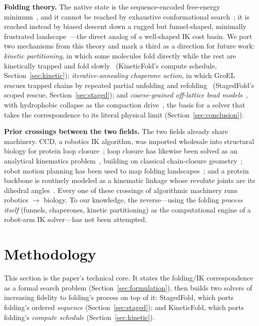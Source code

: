 \documentclass[10pt,conference]{IEEEtran}
\begin{document}
\textbf{Folding theory.} The native state is the sequence-encoded free-energy
minimum~\cite{b23}, and it cannot be reached by exhaustive conformational
search~\cite{b24}; it is reached instead by biased descent down a rugged but
funnel-shaped, minimally frustrated landscape~\cite{b25,b26,b27,b28}---the
direct analog of a well-shaped IK cost basin. We port two mechanisms from this
theory and mark a third as a direction for future work: \emph{kinetic
partitioning}, in which some molecules fold directly while the rest are
kinetically trapped and fold slowly~\cite{b29} (KineticFold's compute schedule,
Section~\ref{sec:kinetic}); \emph{iterative-annealing chaperone action}, in
which GroEL rescues trapped chains by repeated partial unfolding and
refolding~\cite{b30,b31} (StagedFold's scoped rescue,
Section~\ref{sec:staged}); and \emph{coarse-grained off-lattice bead
models}~\cite{b32}, with hydrophobic collapse as the compaction drive~\cite{b33},
the basis for a solver that takes the correspondence to its literal physical
limit (Section~\ref{sec:conclusion}).

\textbf{Prior crossings between the two fields.} The two fields already share
machinery. CCD, a robotics IK algorithm, was imported wholesale into structural
biology for protein loop closure~\cite{b1}; loop closure has likewise been
solved as an analytical kinematics problem~\cite{b34}, building on classical
chain-closure geometry~\cite{b35}; robot motion planning has been used to map
folding landscapes~\cite{b36}; and a protein backbone is routinely modeled as a
kinematic linkage whose revolute joints are its dihedral
angles~\cite{b37,b38}. Every one of these crossings of algorithmic machinery
runs robotics $\rightarrow$ biology. To our knowledge, the reverse---using the
folding \emph{process itself} (funnels, chaperones, kinetic partitioning) as the
computational engine of a robot-arm IK solver---has not been attempted.

\section{Methodology}
\label{sec:method}

This section is the paper's technical core. It states the folding/IK
correspondence as a formal search problem (Section~\ref{sec:formulation}), then
builds two solvers of increasing fidelity to folding's process on top of it:
StagedFold, which ports folding's ordered \emph{sequence}
(Section~\ref{sec:staged}); and KineticFold, which ports folding's \emph{compute
schedule} (Section~\ref{sec:kinetic}).
\end{document}
